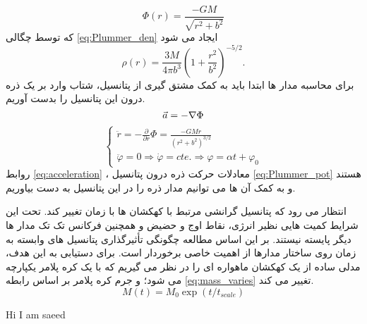 \documentclass[a4paper,12pt]{article}
\begin{document}
\begin{equation}
 \Phi(r)=\frac{-GM}{\sqrt{r^{2}+b^{2}}}
 \label{eq:Plummer_pot}
\end{equation}
که توسط چگالی 
\ref{eq:Plummer_den}
ایجاد می شود
\begin{equation}
\rho(r)=\frac{3M}{4\pi b^{3}}\left( 1+\frac{r^{2}}{b^{2}} \right)^{-5/2}.
 \label{eq:Plummer_den}
\end{equation}
برای محاسبه مدار ها ابتدا باید به کمک مشتق گیری از پتانسیل، شتاب وارد بر یک ذره 
درون این پتانسیل را بدست آوریم.
\begin{equation}
 \vec{a} = - \nabla \Phi  \\
\label{eq:acceleration}
\end{equation}
\[
\left\{
  \begin{array}{ll}
   \ddot{r} = -\frac{\partial}{\partial r} \Phi=\frac{-GMr}{(r^{2}+b^{2})^{3/2}}\\
   \ddot{\varphi}= 0 \Rightarrow \dot{\varphi}=cte. \Rightarrow \varphi=\alpha 
t+\varphi_{0}
  \end{array}
  \right.
\]
روابط
\ref{eq:acceleration}
، معادلات حرکت ذره درون پتانسیل 
\ref{eq:Plummer_pot}
هستند و به کمک آن ها می توانیم مدار ذره را در این پتانسیل به دست بیاوریم.

انتظار می رود که پتانسیل گرانشی مرتبط با کهکشان ها با زمان تغییر کند. تحت این شرایط کمیت 
هایی نظیر انرژی، نقاط اوج و حضیض و همچنین فرکانس تک تک مدار ها دیگر پایسته نیستند. 
بر این اساس مطالعه چگونگی تأثیرگذاری پتانسیل های وابسته به زمان روی ساختار مدارها از 
اهمیت خاصی برخوردار است. برای دستیابی به این هدف، مدلی ساده از یک کهکشان ماهواره ای را در 
نظر می گیریم که با یک کره پلامر یکپارچه می شود؛ و جرم کره پلامر بر اساس رابطه
\ref{eq:mass_varies}
تغییر می کند.
\begin{equation}
 \label{eq:mass_varies}
 M(t)=M_{0} \exp (t/t_{scale})
\end{equation}
\begin{latin}
	Hi I am saeed
\end{latin}

% 
\end{document}
